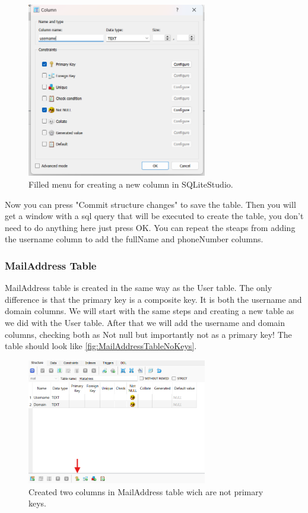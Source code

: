 \documentclass[a4paper,11pt,oneside]{article}
\begin{document}
\begin{sloppypar}
\begin{figure}[!htb]
  \centering
  \includegraphics[width=0.7\textwidth]{sqlitestudio/create_user/create_user_column_populated.png}
  \caption{Filled menu for creating a new column in SQLiteStudio.}
  \label{fig:FilledNewColumnUser}
\end{figure}
Now you can press "Commit structure changes" to save the table. Then you will get a window with a sql query that will be executed to create the table, you don't need to do anything here just press OK. 
You can repeat the steaps from adding the username column to add the fullName and phoneNumber columns.   

\subsubsection{MailAddress Table}
\label{sqliteStudioMailAddressTable}
MailAddress table is created in the same way as the User table. The only difference is that the primary key is a composite key. It is both the username and domain columns. We will start with the same steps and creating a new table as we did with the User table. After that we will add the username and domain columns, checking both as Not null but importantly not as a primary key! The table should look like \autoref{fig:MailAddressTableNoKeys}.
\begin{figure}[!htb]
  \centering
  \includegraphics[width=0.7\textwidth]{sqlitestudio/create_mail_address/create_mail.png}
  \caption{Created two columns in MailAddress table wich are not primary keys.} 
  \label{fig:MailAddressTableNoKeys}
\end{figure}


\end{sloppypar}
\end{document}
